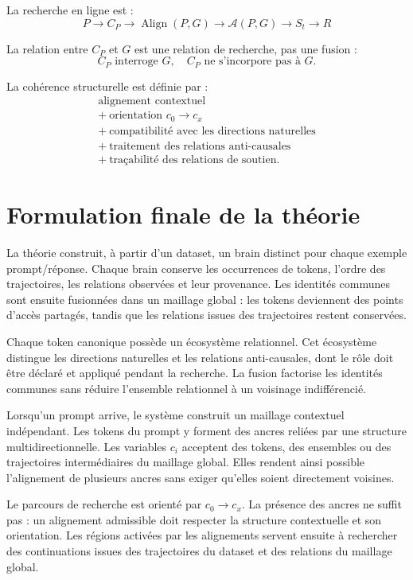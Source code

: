 \documentclass[11pt,a4paper]{report}
\theoremstyle{definition}
\theoremstyle{plain}
\theoremstyle{remark}
\newcommand{\A}{\mathcal{A}}
\newcommand{\Align}{\operatorname{Align}}
\begin{document}
La recherche en ligne est :
\[
\boxed{
P
\longrightarrow
C_P
\longrightarrow
\Align(P,G)
\longrightarrow
\A(P,G)
\longrightarrow
S_t
\longrightarrow
R
}
\]

La relation entre \(C_P\) et \(G\) est une relation de recherche,
pas une fusion :
\[
\boxed{C_P\text{ interroge }G,\quad C_P\text{ ne s'incorpore pas à }G.}
\]

La cohérence structurelle est définie par :
\[
\boxed{
\begin{gathered}
\text{alignement contextuel}\\
+\ \text{orientation }c_0\to c_x\\
+\ \text{compatibilité avec les directions naturelles}\\
+\ \text{traitement des relations anti-causales}\\
+\ \text{traçabilité des relations de soutien}.
\end{gathered}
}
\]

\section{Formulation finale de la théorie}

La théorie construit, à partir d'un dataset, un brain distinct
pour chaque exemple prompt/réponse. Chaque brain conserve les
occurrences de tokens, l'ordre des trajectoires, les relations
observées et leur provenance. Les identités communes sont
ensuite fusionnées dans un maillage global : les tokens deviennent
des points d'accès partagés, tandis que les relations issues des
trajectoires restent conservées.

Chaque token canonique possède un écosystème relationnel. Cet
écosystème distingue les directions naturelles et les relations
anti-causales, dont le rôle doit être déclaré et appliqué pendant
la recherche. La fusion factorise les identités communes sans
réduire l'ensemble relationnel à un voisinage indifférencié.

Lorsqu'un prompt arrive, le système construit un maillage
contextuel indépendant. Les tokens du prompt y forment des ancres
reliées par une structure multidirectionnelle. Les variables
\(c_i\) acceptent des tokens, des ensembles ou des trajectoires
intermédiaires du maillage global. Elles rendent ainsi possible
l'alignement de plusieurs ancres sans exiger qu'elles soient
directement voisines.

Le parcours de recherche est orienté par \(c_0\to c_x\). La
présence des ancres ne suffit pas : un alignement admissible
doit respecter la structure contextuelle et son orientation.
Les régions activées par les alignements servent ensuite à
rechercher des continuations issues des trajectoires du dataset
et des relations du maillage global.
\end{document}
